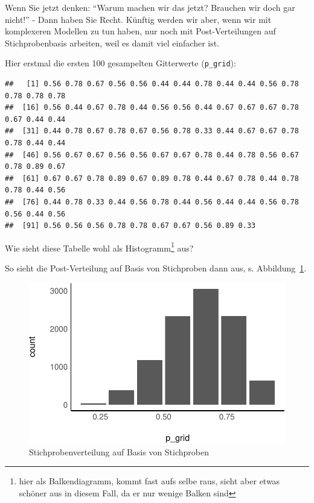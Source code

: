\documentclass[
  a4paper,
  DIV=11]{scrreprt}
\theoremstyle{definition}
\theoremstyle{remark}
\begin{document}
Wenn Sie jetzt denken: ``Warum machen wir das jetzt? Brauchen wir doch
gar nicht!'' - Dann haben Sie Recht. Künftig werden wir aber, wenn wir
mit komplexeren Modellen zu tun haben, nur noch mit Post-Verteilungen
auf Stichprobenbasis arbeiten, weil es damit viel einfacher ist.

Hier erstmal die ersten 100 gesampelten Gitterwerte (\texttt{p\_grid}):

\begin{verbatim}
##   [1] 0.56 0.78 0.67 0.56 0.56 0.44 0.44 0.78 0.44 0.44 0.56 0.78 0.78 0.78 0.78
##  [16] 0.56 0.44 0.67 0.78 0.44 0.56 0.56 0.44 0.67 0.67 0.67 0.78 0.67 0.44 0.44
##  [31] 0.44 0.78 0.67 0.78 0.67 0.56 0.78 0.33 0.44 0.67 0.67 0.78 0.78 0.44 0.44
##  [46] 0.56 0.67 0.67 0.56 0.56 0.67 0.67 0.78 0.44 0.78 0.56 0.67 0.78 0.89 0.67
##  [61] 0.67 0.67 0.78 0.89 0.67 0.89 0.78 0.44 0.67 0.78 0.44 0.78 0.78 0.44 0.56
##  [76] 0.44 0.78 0.33 0.44 0.56 0.78 0.44 0.56 0.44 0.44 0.56 0.78 0.56 0.44 0.56
##  [91] 0.56 0.56 0.56 0.78 0.78 0.67 0.67 0.56 0.89 0.33
\end{verbatim}

Wie sieht diese Tabelle wohl als Histogramm\footnote{hier als
  Balkendiagramm, kommt fast aufs selbe raus, sieht aber etwas schöner
  aus in diesem Fall, da er nur wenige Balken sind} aus?

So sieht die Post-Verteilung auf Basis von Stichproben dann aus, s.
Abbildung~\ref{fig-samples1}.

\begin{figure}

{\centering \includegraphics{./Post_files/figure-pdf/fig-samples1-1.pdf}

}

\caption{\label{fig-samples1}Stichprobenverteilung auf Basis von
Stichproben}

\end{figure}
\end{document}
